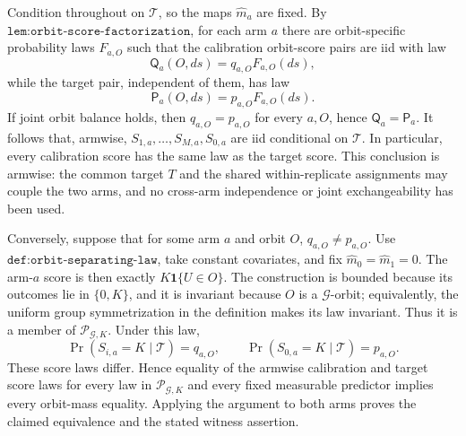 Condition throughout on \(\mathcal T\), so the maps \(\widehat m_a\) are fixed. By \(\texttt{lem:orbit-score-factorization}\), for each arm \(a\) there are orbit-specific probability laws \(F_{a,O}\) such that the calibration orbit-score pairs are iid with law \[\mathsf Q_a(O,ds)=q_{a,O}F_{a,O}(ds),\] while the target pair, independent of them, has law \[\mathsf P_a(O,ds)=p_{a,O}F_{a,O}(ds).\] If joint orbit balance holds, then \(q_{a,O}=p_{a,O}\) for every \(a,O\), hence \(\mathsf Q_a=\mathsf P_a\). It follows that, armwise, \(S_{1,a},\ldots,S_{M,a},S_{0,a}\) are iid conditional on \(\mathcal T\). In particular, every calibration score has the same law as the target score. This conclusion is armwise: the common target \(T\) and the shared within-replicate assignments may couple the two arms, and no cross-arm independence or joint exchangeability has been used.

Conversely, suppose that for some arm \(a\) and orbit \(O\), \(q_{a,O}\ne p_{a,O}\). Use \(\texttt{def:orbit-separating-law}\), take constant covariates, and fix \(\widehat m_0=\widehat m_1=0\). The arm-\(a\) score is then exactly \(K\mathbf 1\{U\in O\}\). The construction is bounded because its outcomes lie in \(\{0,K\}\), and it is invariant because \(O\) is a \(\mathcal G\)-orbit; equivalently, the uniform group symmetrization in the definition makes its law invariant. Thus it is a member of \(\mathcal P_{\mathcal G,K}\). Under this law, \[\Pr(S_{i,a}=K\mid\mathcal T)=q_{a,O},\qquad \Pr(S_{0,a}=K\mid\mathcal T)=p_{a,O}.\] These score laws differ. Hence equality of the armwise calibration and target score laws for every law in \(\mathcal P_{\mathcal G,K}\) and every fixed measurable predictor implies every orbit-mass equality. Applying the argument to both arms proves the claimed equivalence and the stated witness assertion.